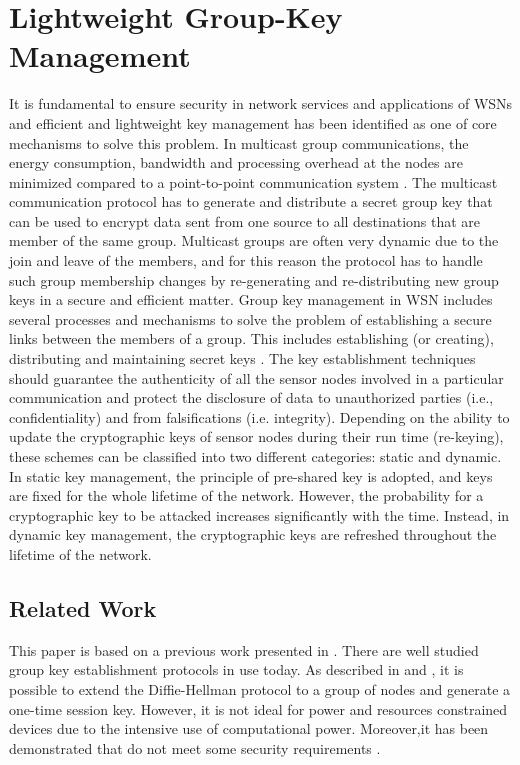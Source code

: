 \chapter{Lightweight Group-Key Management}

It is fundamental to ensure security in network services and applications of WSNs and efficient and lightweight key management has been identified as one of core mechanisms to solve this problem.
In multicast group communications, the energy consumption, bandwidth and processing overhead at the nodes are minimized compared to a point-to-point communication system \cite{Rahman2015}. 
The multicast communication protocol has to generate and distribute a secret group key that can be used to encrypt data sent from one source to all destinations that are member of the same group. 
Multicast groups are often very dynamic due to the join and leave of the members, and for this reason the protocol has to handle such group membership changes by re-generating and re-distributing new group keys in a secure and efficient matter. 
Group key management in WSN includes several processes and mechanisms to solve the problem of  establishing a secure links between the members of a group.
This includes establishing (or creating), distributing and maintaining secret keys \cite{He2013JournalSurvey}.
The key establishment techniques should guarantee the authenticity of all the sensor nodes involved in a particular communication and protect the disclosure of data to unauthorized parties (i.e., confidentiality) and from falsifications (i.e. integrity).
Depending on the ability to update the cryptographic keys of sensor nodes during their run time (re-keying), these schemes can be classified into two different categories: static and dynamic.  
In static key management, the principle of pre-shared key is adopted, and keys are fixed for the whole lifetime  of  the  network.  
However, the probability for a cryptographic key to be attacked increases significantly with the time.  
Instead, in dynamic key management, the cryptographic keys are refreshed  throughout the lifetime of the network.

\section{Related Work}
This paper is based on a previous work presented in \cite{Gebremichael2018}.
There are well studied group key establishment protocols in use today. As described in \cite{Steiner1996}and \cite{Bresson2007}, it is possible to extend the Diffie-Hellman protocol to a group of nodes and generate a one-time session key. However, it is not ideal for power and resources constrained devices due to the intensive use of computational power. Moreover,it has been demonstrated that \cite{Bresson2007} do not meet some security requirements \cite{Bohli2007}.


